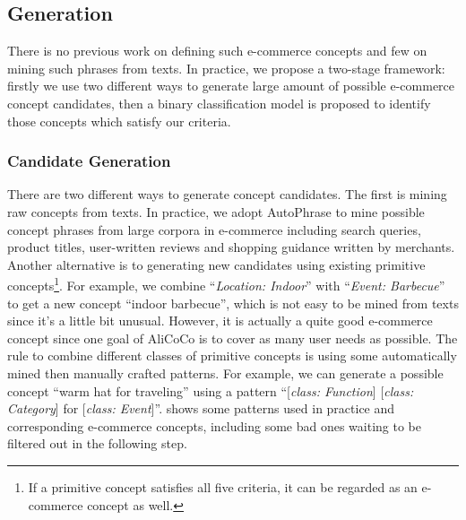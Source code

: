 \subsection{Generation}

There is no previous work on defining such e-commerce concepts and few on mining such phrases from texts. 
In practice, we propose a two-stage framework: 
firstly we use two different ways to generate large amount of possible e-commerce concept candidates,
then a binary classification model is proposed to 
identify those concepts which satisfy our criteria.

\subsubsection{Candidate Generation}
There are two different ways to generate concept candidates. 
The first is mining raw concepts from texts.
In practice, we adopt AutoPhrase\cite{shang2018automated} to mine possible concept phrases from large corpora in e-commerce including search queries, product titles, user-written reviews and shopping guidance written by merchants.
Another alternative is to generating new candidates using existing primitive concepts\footnote{If a primitive concept satisfies all five criteria, it can be regarded as an e-commerce concept as well.}. 
For example, we combine ``\textit{Location: Indoor}'' with ``\textit{Event: Barbecue}'' to get a new concept ``indoor barbecue'', which is not easy to be mined from texts since it's a little bit unusual.
However, it is actually a quite good e-commerce concept 
since one goal of AliCoCo is to cover as many user needs as possible.
The rule to combine different classes of primitive concepts is using some automatically mined then manually crafted patterns.
For example, we can generate a possible concept ``warm hat for traveling'' using a pattern ``[\textit{class: Function}] [\textit{class: Category}] for [\textit{class: Event}]''.
 shows some patterns used in practice and corresponding e-commerce concepts, including some bad ones waiting to be filtered out in the following step.

